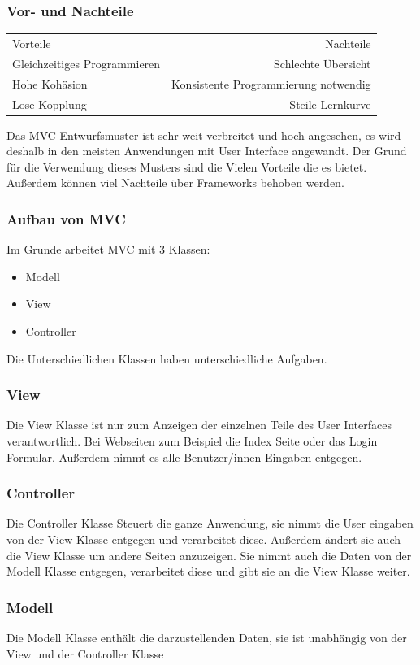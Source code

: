 \subsubsection{Vor- und Nachteile}
\begin{tabular}{ l r }
	Vorteile & Nachteile \\
	Gleichzeitiges Programmieren & Schlechte Übersicht \\
	Hohe Kohäsion \cite{kohaesion} & Konsistente Programmierung notwendig\\
	Lose Kopplung \cite{kopplung} & Steile Lernkurve \\	
\end{tabular}

Das MVC Entwurfsmuster ist sehr weit verbreitet und hoch angesehen, es wird deshalb in den meisten Anwendungen mit User Interface angewandt. Der Grund für die Verwendung dieses Musters sind die Vielen Vorteile die es bietet. Außerdem können viel Nachteile über Frameworks behoben werden.

\subsubsection{Aufbau von MVC}
Im Grunde arbeitet MVC mit 3 Klassen:
\begin{itemize}
	\item Modell
	\item View
	\item Controller
\end{itemize}
Die Unterschiedlichen Klassen haben unterschiedliche Aufgaben.

\subsubsection{View}
Die View Klasse ist nur zum Anzeigen der einzelnen Teile des User Interfaces verantwortlich. Bei Webseiten zum Beispiel die Index Seite oder das Login Formular. Außerdem nimmt es alle Benutzer/innen Eingaben entgegen.
\subsubsection{Controller}
Die Controller Klasse Steuert die ganze Anwendung, sie nimmt die User eingaben von der View Klasse entgegen und verarbeitet diese. Außerdem ändert sie auch die View Klasse um andere Seiten anzuzeigen. Sie nimmt auch die Daten von der Modell Klasse entgegen, verarbeitet diese und gibt sie an die View Klasse weiter.
\subsubsection{Modell}
Die Modell Klasse enthält die darzustellenden Daten, sie ist unabhängig von der View und der Controller Klasse

